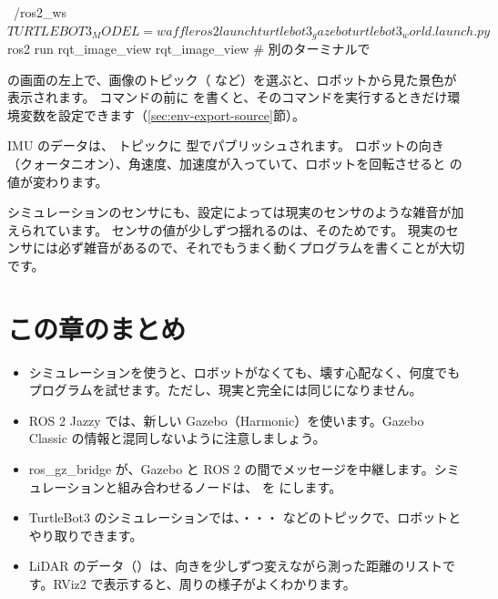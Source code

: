 \begin{terminal}
~/ros2_ws$ TURTLEBOT3_MODEL=waffle ros2 launch turtlebot3_gazebo turtlebot3_world.launch.py
$ ros2 run rqt_image_view rqt_image_view   # 別のターミナルで
\end{terminal}

 の画面の左上で、画像のトピック（ など）を選ぶと、ロボットから見た景色が表示されます。
コマンドの前に  を書くと、そのコマンドを実行するときだけ環境変数を設定できます（\ref{sec:env-export-source}節）。

IMU のデータは、 トピックに  型でパブリッシュされます。
ロボットの向き（クォータニオン）、角速度、加速度が入っていて、ロボットを回転させると  の値が変わります。


シミュレーションのセンサにも、設定によっては現実のセンサのような雑音が加えられています。
センサの値が少しずつ揺れるのは、そのためです。
現実のセンサには必ず雑音があるので、それでもうまく動くプログラムを書くことが大切です。

\section*{この章のまとめ}

\begin{itemize}
  \item シミュレーションを使うと、ロボットがなくても、壊す心配なく、何度でもプログラムを試せます。ただし、現実と完全には同じになりません。
  \item ROS 2 Jazzy では、新しい Gazebo（Harmonic）を使います。Gazebo Classic の情報と混同しないように注意しましょう。
  \item ros\_gz\_bridge が、Gazebo と ROS 2 の間でメッセージを中継します。シミュレーションと組み合わせるノードは、 を  にします。
  \item TurtleBot3 のシミュレーションでは、・・・ などのトピックで、ロボットとやり取りできます。
  \item LiDAR のデータ（）は、向きを少しずつ変えながら測った距離のリストです。RViz2 で表示すると、周りの様子がよくわかります。
\end{itemize}
